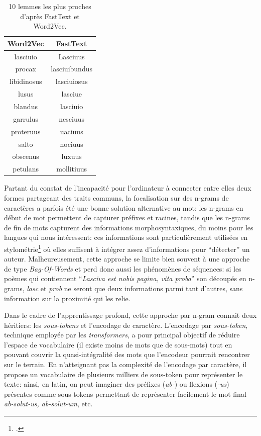 \begin{table}[ht]
    \centering
    \begin{tabular}{c|c}
        Word2Vec    &  FastText      \\ \hline
        lasciuio    &  Lasciuus      \\
        procax      &  lasciuibundus \\
        libidinosus &  lasciuiosus   \\
        lusus       &  lasciue       \\
        blandus     &  lasciuio      \\
        garrulus    &  nesciuus      \\
        proteruus   &  uaciuus       \\
        salto       &  nociuus       \\
        obscenus    &  luxuus        \\
        petulans    &  mollitiuus    \\
    \end{tabular}
    \caption{10 lemmes les plus proches d'après FastText et Word2Vec.}
    \label{tab:fasttext:lemmes}
\end{table}


Partant du constat de l'incapacité pour l'ordinateur à connecter entre elles deux formes partageant des traits communs, la focalisation sur des n-grams de caractères a parfois été une bonne solution alternative au mot: les n-grams en début de mot permettent de capturer préfixes et racines, tandis que les n-grams de fin de mots capturent des informations morphosyntaxiques, du moins pour les langues qui nous intéressent: ces informations sont particulièrement utilisées en stylométrie\footcite{kestemont_authenticating_2016, camps_stylometry_2020} où elles suffisent à intégrer assez d'informations pour \enquote{détecter} un auteur. Malheureusement, cette approche se limite bien souvent à une approche de type \textit{Bag-Of-Words} et perd donc aussi les phénomènes de séquences: si les poèmes qui contiennent \enquote{\textit{Lasciva est nobis pagina, vita proba}} son découpés en n-grams, \textit{lasc} et \textit{prob} ne seront que deux informations parmi tant d'autres, sans information sur la proximité qui les relie.

Dans le cadre de l'apprentissage profond, cette approche par n-gram connait deux héritiers: les \textit{sous-tokens} et l'encodage de caractère. L'encodage par \textit{sous-token}, technique employée par les \textit{transformers}, a pour principal objectif de réduire l'espace de vocabulaire (il existe moins de mots que de sous-mots) tout en pouvant couvrir la quasi-intégralité des mots que l'encodeur pourrait rencontrer sur le terrain. En n'atteignant pas la complexité de l'encodage par caractère, il propose un vocabulaire de plusieurs milliers de sous-token pour représenter le texte: ainsi, en latin, on peut imaginer des préfixes (\textit{ab-}) ou flexions (\textit{-us}) présentes comme sous-tokens permettant de représenter facilement le mot final \textit{ab-solut-us, ab-solut-um}, etc.

